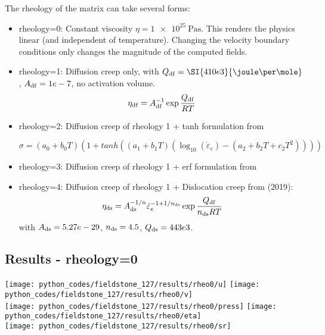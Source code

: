 The rheology of the matrix can take several forms:
\begin{itemize}

\item {\python rheology=0}: Constant viscosity $\eta=\SI{1e25}{\pascal\second}$. This renders
the physics linear (and independent of temperature). Changing the velocity boundary conditions
only changes the magnitude of the computed fields.

\item {\python rheology=1}: Diffusion creep only, with $Q_{\rm df}=\SI{410e3}{\joule\per\mole}$, 
$A_{\rm df}=1e-7$, no activation volume.
\[
\eta_{\rm df}=A_{\rm df}^{-1}\exp \frac{Q_{\rm df}}{RT}
\]

\item {\python rheology=2}: Diffusion creep of rheology 1 + tanh formulation from \textcite{gatt20} 

\[
\sigma = (a_0+b_0T) \left( 1+ tanh( (a_1+b_1T)(\log_{10}(\dot\varepsilon_e)- (a_2+b_2T+c_2T^2)) )  \right)
\]

\item {\python rheology=3}: Diffusion creep of rheology 1 + erf formulation from \textcite{gatt20} 


\item {\python rheology=4}: Diffusion creep of rheology 1 + Dislocation creep from \textcite{gocg19} (2019):
\[
\eta_{\rm ds} = A_{\rm ds}^{-1/n} \dot\varepsilon_e^{-1+1/n_{\rm ds}}\exp \frac{Q_{\rm df}}{n_{\rm ds}RT}
\]
with $A_{\rm ds}=5.27e-29$, $n_{\rm ds}=4.5$, $Q_{\rm ds}=443e3$.

\end{itemize}



\newpage
\subsection*{Results - rheology=0}

\begin{center}
\texttt{[image: python\_codes/fieldstone\_127/results/rheo0/u]}
\texttt{[image: python\_codes/fieldstone\_127/results/rheo0/v]}\\
\texttt{[image: python\_codes/fieldstone\_127/results/rheo0/press]}
\texttt{[image: python\_codes/fieldstone\_127/results/rheo0/eta]}\\
\texttt{[image: python\_codes/fieldstone\_127/results/rheo0/sr]}
\end{center}

